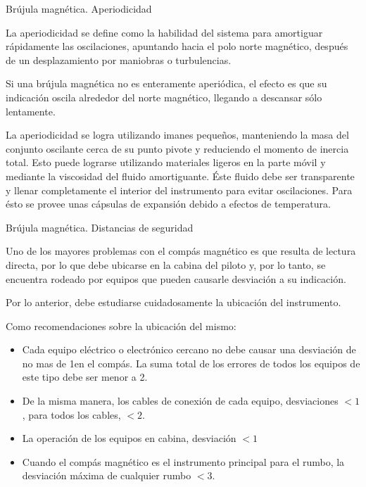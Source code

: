  \begin{frame}{  Br\'ujula magn\'etica. Aperiodicidad }

 La aperiodicidad se define como la habilidad del sistema para amortiguar r\'apidamente las oscilaciones, apuntando hacia el polo norte magn\'etico, despu\'es de un desplazamiento por maniobras o turbulencias.
  
 Si una br\'ujula magn\'etica no es enteramente aperi\'odica, el efecto es que su indicaci\'on oscila alrededor del norte magn\'etico, llegando a descansar s\'olo lentamente.

 La aperiodicidad se logra utilizando imanes peque\~nos, manteniendo la masa del conjunto oscilante
 cerca de su punto pivote y reduciendo el momento de inercia total. Esto puede lograrse utilizando
 materiales ligeros en la parte m\'ovil y mediante la viscosidad del fluido amortiguante. \'Este
 fluido debe ser transparente y  llenar completamente el interior del instrumento para evitar oscilaciones.
 Para \'esto se provee unas c\'apsulas de expansi\'on debido a efectos de temperatura.

 \end{frame}  

\begin{frame}{Br\'ujula magn\'etica. Distancias de seguridad}

  Uno de los mayores problemas con el comp\'as magn\'etico es que resulta de lectura directa, por lo
  que debe ubicarse en la cabina del piloto y, por lo tanto, se encuentra rodeado por
  equipos que pueden causarle desviaci\'on a su indicaci\'on.

  Por lo anterior, debe estudiarse cuidadosamente la ubicaci\'on del instrumento.

  Como recomendaciones sobre la ubicaci\'on del mismo:

  \begin{itemize}
  \item Cada equipo el\'ectrico o electr\'onico cercano no debe causar una desviaci\'on
    de no mas de 1\grad en el comp\'as. La suma total de los errores de todos los equipos de este
    tipo debe ser menor a 2\grad.
  \item De la misma manera, los cables de conexi\'on de cada equipo, desviaciones $< 1$\grad, para
    todos los cables, $<2$\grad.
  \item La operaci\'on de los equipos en cabina, desviaci\'on $< 1$\grad
  \item Cuando el comp\'as magn\'etico es el instrumento principal para el rumbo, la desviaci\'on
    m\'axima de cualquier rumbo $< 3$\grad.
  \end{itemize}
 
 
 \end{frame}

